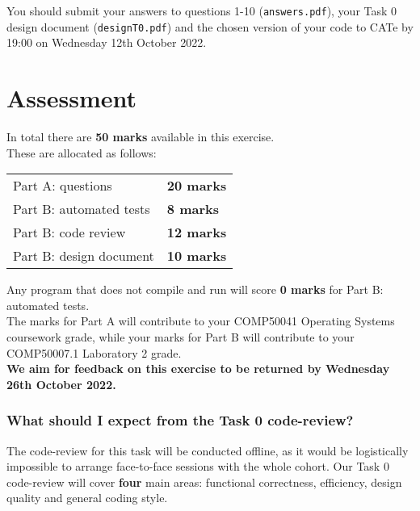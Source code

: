 \documentclass[a4paper,12pt]{article}
\newcommand{\shell}[1]{\lstinline!#1!}
\begin{document}
You should submit your answers to questions 1-10 (\shell{answers.pdf}), your Task 0 design document (\shell{designT0.pdf}) and the chosen version of your code to CATe by 19:00 on Wednesday 12th October 2022.\\


\section*{Assessment}
In total there are {\bf 50 marks} available in this exercise.\\
These are allocated as follows:
%
\begin{center}
\begin{tabular}{l@{\qquad\qquad}l}
  Part A: questions       & {\bf 20 marks} \\
  Part B: automated tests & {\bf 8 marks} \\
  Part B: code review     & {\bf 12 marks} \\
  Part B: design document & {\bf 10 marks} \\    
\end{tabular}
\end{center}
%
Any program that does not compile and run will score {\bf 0 marks} for Part B: automated tests.\\[-0.8em]

\noindent The marks for Part A will contribute to your COMP50041 Operating Systems coursework grade,
while your marks for Part B will contribute to your COMP50007.1 Laboratory 2 grade.\\


\noindent \textbf{We aim for feedback on this exercise to be returned by Wednesday 26th October 2022.}\\


\subsubsection*{What should I expect from the Task 0 code-review?}

The code-review for this task will be conducted offline, as it would be logistically
impossible to arrange face-to-face sessions with the whole cohort.
Our Task 0 code-review will cover \textbf{four} main areas: 
functional correctness, efficiency, design quality and general coding style.
\end{document}
